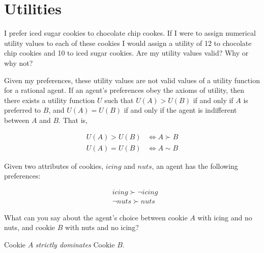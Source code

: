 \section{Utilities}

\begin{questions}

\question I prefer iced sugar cookies to chocolate chip cookes.  If I were to assign numerical utility values to each of these cookies I would assign a utility of 12 to chocolate chip cookies and 10 to iced sugar cookies.  Are my utility values valid?  Why or why not?

\begin{solution}[1.5in]
Given my preferences, these utility values are not valid values of a utility function for a rational agent.  If an agent’s preferences obey the axioms of utility, then there exists a utility function $U$ such that $U(A) > U(B)$ if and only if $A$ is preferred to $B$, and $U(A) = U(B)$ if and only if the agent is indifferent between $A$ and $B$. That is,

\begin{align*}
U(A) > U(B) & \iff A \succ B\\
U(A) = U(B) & \iff A \sim B
\end{align*}
\end{solution}

\question Given two attributes of cookies, $icing$ and $nuts$, an agent has the following preferences:

\begin{align*}
& icing \succ \neg icing\\
& \neg nuts \succ nuts
\end{align*}

What can you say about the agent's choice between cookie $A$ with icing and no nuts, and cookie $B$ with nuts and no icing?

\begin{solution}[.5in]
Cookie $A$ {\it strictly dominates} Cookie $B$.
\end{solution}

\end{questions}




